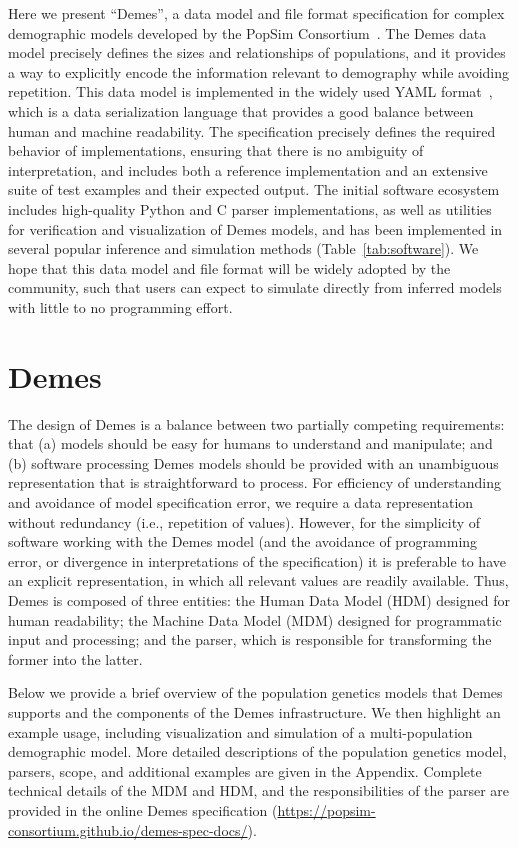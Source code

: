 \documentclass[11pt]{article}
\begin{document}
Here we present ``Demes'', a data model and file format specification for
complex demographic models developed by the
PopSim Consortium~\citep{adrion2020community}.
The Demes data model precisely defines the sizes and relationships
of populations, and it provides a way to explicitly encode the
information relevant to demography while avoiding repetition.
This data model is implemented in the widely used YAML
format~\citep{ben2009yaml}, which is a data serialization language that
provides a good balance between human and machine readability.
The specification precisely defines the required behavior of implementations,
ensuring that there is no ambiguity of interpretation, and includes both a
reference implementation and an extensive suite of test examples and their
expected output.
The initial software ecosystem includes high-quality Python
and C parser implementations, as well as utilities for verification and
visualization of Demes models, and has been implemented in several popular
inference and simulation methods (Table~\ref{tab:software}).
We hope that this data model and file format will be widely adopted
by the community, such that users can expect to simulate directly
from inferred models with little to no programming effort.


\section*{Demes}

The design of Demes is a balance between two partially competing requirements:
that (a) models should be easy for humans to understand and manipulate;
and (b) software processing Demes models should be provided with an unambiguous
representation that is straightforward to process.
For efficiency of understanding and avoidance of model specification error,
we require a data representation without redundancy (i.e., repetition of values).
However, for the simplicity of software working with the Demes model
(and the avoidance of programming error, or divergence in
interpretations of the specification) it is preferable to have an explicit
representation, in which all relevant values are readily available.
Thus, Demes is composed of three entities:
the Human Data Model (HDM) designed for human readability;
the Machine Data Model (MDM) designed for programmatic input and processing;
and the parser, which is responsible for transforming the former
into the latter.

Below we provide a brief overview of the population genetics models
that Demes supports and the components of the Demes infrastructure.
We then highlight an example usage, including visualization and simulation
of a multi-population demographic model.
More detailed descriptions of the population genetics model, parsers, scope, and
additional examples are given in the Appendix.
Complete technical details of the MDM and HDM, and the responsibilities
of the parser are provided in the online Demes specification
(\url{https://popsim-consortium.github.io/demes-spec-docs/}).
\end{document}

